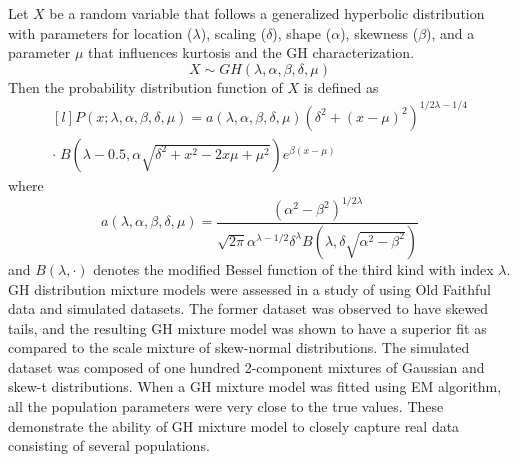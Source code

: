 Let \(X\) be a random variable that follows a generalized hyperbolic distribution with parameters for location (\(\lambda\)), scaling (\(\delta\)), shape (\(\alpha\)), skewness (\(\beta\)), and a parameter \(\mu\) that influences kurtosis and the GH characterization. 
\[
    X \sim GH(\lambda, \alpha, \beta, \delta, \mu)
\]
Then the probability distribution function of \(X\) is defined as
\begin{equation}
    \begin{aligned}[l]
    P(x; \lambda, \alpha, \beta, \delta, \mu) = a(\lambda, \alpha, \beta, \delta, \mu) (\delta^2+(x-\mu)^2)^{1/2\lambda-1/4} \\
    \cdot \; B(\lambda-0.5, \alpha\sqrt{\delta^2+x^2-2x\mu+\mu^2})e^{\beta(x-\mu)}
    \end{aligned}
\end{equation}
where
\[
    a(\lambda, \alpha, \beta, \delta, \mu) = \frac{(\alpha^2-\beta^2)^{1/2\lambda}}{\sqrt{2\pi}\alpha^{\lambda-1/2}\delta^\lambda B(\lambda, \delta\sqrt{\alpha^2 - \beta^2})}
\]
and \(B(\lambda, \cdot)\) denotes the modified Bessel function of the third kind with index \(\lambda\).
GH distribution mixture models were assessed in a study of  using Old Faithful data \cite{GeyserTimes} and simulated datasets. The former dataset was observed to have skewed tails, and the resulting GH mixture model was shown to have a superior fit as compared to the scale mixture of skew-normal distributions. The simulated dataset was composed of one hundred 2-component mixtures of Gaussian and skew-t distributions. When a GH mixture model was fitted using EM algorithm, all the population parameters were very close to the true values. These demonstrate the ability of GH mixture model to closely capture real data consisting of several populations.
